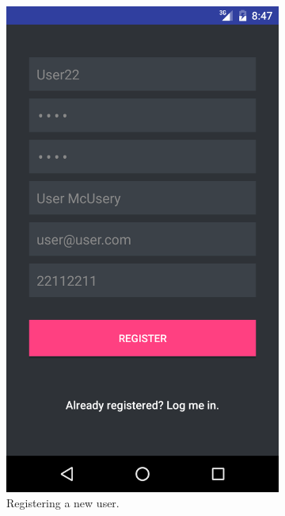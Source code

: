 \begin{figure}[ht!]
\centering
\begin{subfigure}[b]{0.24\textwidth}
        \includegraphics[width=\textwidth]{figures/s4test/newuser.png}
        \caption{Registering a new user.}
        \label{s4tp:newuser}
\end{subfigure}
\begin{subfigure}[b]{0.24\textwidth}

\end{subfigure}
\end{figure}
